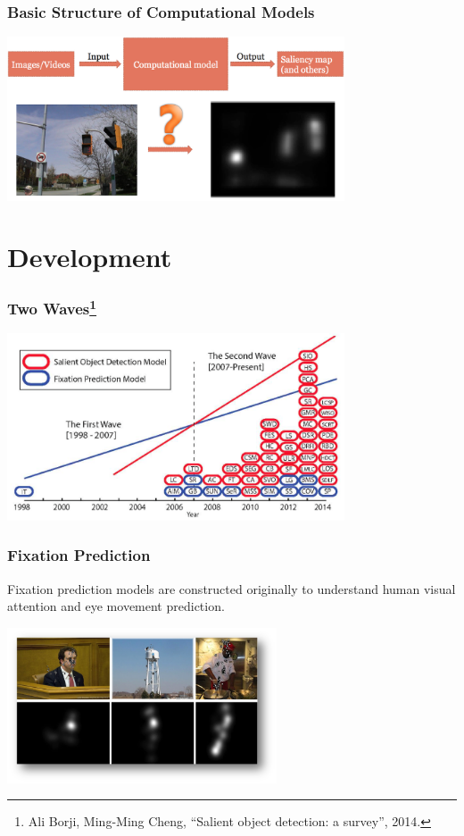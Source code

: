 \documentclass[notheorems,serif,table,compress]{beamer}  %
\begin{document}
\begin{frame}
\frametitle{Basic Structure of Computational Models}
\centering\includegraphics[width=10cm]{BasicStructure.jpg}
\end{frame}


\section{Development}

\begin{frame}
\frametitle{Two Waves\footnote{Ali Borji, Ming-Ming Cheng, ``Salient object detection: a survey'', 2014.}}
\centering\includegraphics[width=10cm]{wave}
\end{frame}


\begin{frame}
\frametitle{Fixation Prediction}
Fixation prediction models are constructed originally to understand human visual attention and eye movement prediction.

\centering\includegraphics[width=8cm]{fixationPrediction.png}
\end{frame}
\end{document}
